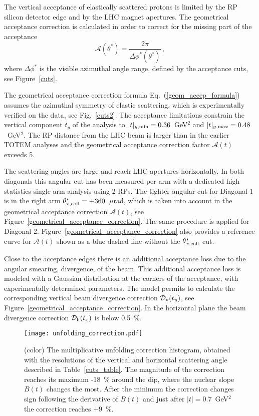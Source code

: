 \documentclass[TOTEM]{cernphprep}
\begin{document}
		{\color{black} The vertical acceptance of elastically scattered protons is limited by the RP silicon detector edge and by the LHC magnet apertures. The geometrical acceptance correction is calculated in order
		to correct for the missing part of the acceptance
		\begin{equation}
			\mathcal{A}(\theta^{*})=\frac{2\pi }{\Delta \phi^{*}(\theta^{*})}\,,
			\label{geom_accep_formula}
		\end{equation}
 		where $\Delta \phi^{*}$ is the visible azimuthal angle range, defined by the acceptance cuts, see Figure~\ref{cuts}.

		The geometrical acceptance correction formula Eq.~(\ref{geom_accep_formula}) assumes the azimuthal symmetry of elastic scattering, which is experimentally verified on the data, see Fig.~\ref{cuts2}. The acceptance limitations constrain the vertical component $t_{y}$ of the analysis to
		{$|t|_{y,\rm min}=0.36$~GeV$^{2}$ and $|t|_{y,\rm max}=0.48$~GeV$^{2}$}. The RP distance from the LHC beam is larger than in the earlier TOTEM analyses and the geometrical acceptance correction
		factor $\mathcal{A}(t)$ exceeds 5.

		The scattering angles are large and reach LHC apertures horizontally. In
		both diagonals this angular cut has been measured per arm with a dedicated high statistics single arm analysis using 2 RPs. The tighter angular cut for Diagonal 1 is
		in the right arm $\theta_{x,\rm coll}^{*}=+360$~$\mu$rad, which is taken into account in the geometrical acceptance correction $\mathcal{A}(t)$, see Figure~\ref{geometrical_acceptance_correction}.
		The same procedure is applied for Diagonal 2. Figure~\ref{geometrical_acceptance_correction} also provides a reference curve for $\mathcal{A}(t)$ shown as a blue dashed line without the $\theta_{x,\rm coll}^{*}$
		cut. 

 		Close to the acceptance edges there is an additional acceptance loss due to the angular smearing, divergence, of the beam. This additional acceptance loss is modeled with a Gaussian distribution at
		the corners of the acceptance, with experimentally determined parameters. The model permits to calculate the corresponding vertical beam divergence correction $\mathcal{D}_{\rm v}(t_{y})$, see Figure~\ref{geometrical_acceptance_correction}. In the horizontal plane the beam divergence correction $\mathcal{D}_{\rm h}(t_{x})$ is below 0.5~\%.
	\begin{figure}[H]
		\centering
		\texttt{[image: unfolding\_correction.pdf]}
		\caption{(color) The multiplicative unfolding correction histogram, obtained with the resolutions of the  vertical and horizontal scattering angle described in Table~\ref{cuts_table}. The magnitude of the
		correction reaches its maximum -18~\% around the dip, where the nuclear slope $B(t)$ changes the most. After the minimum the correction changes sign following the derivative of 
		$B(t)$ and just after $|t|=0.7$~GeV$^{2}$ the correction reaches +9~\%. }
		\label{unfolding_correction}
	\end{figure}

}
\end{document}
